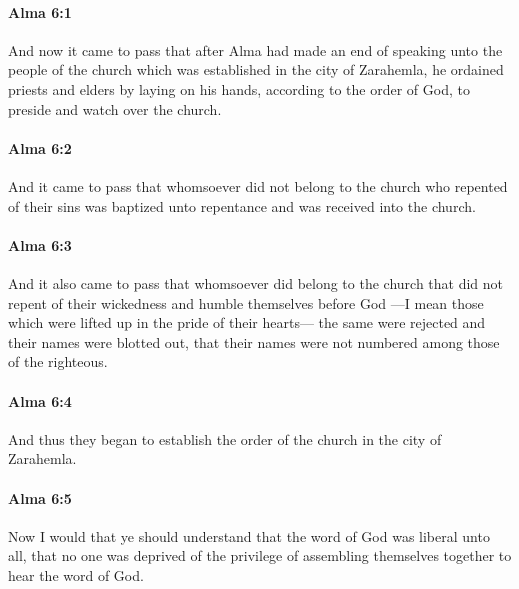 		\paragraph{Alma 6:1} %
			\label{ALMA-6-1}

			And now it came to pass that
			after Alma had made an end of speaking unto the people of the church
			which was established in the city of Zarahemla,
			he ordained priests and elders by laying on his hands,
			according to the order of God,
			to preside and watch over the church.

		\paragraph{Alma 6:2} %
			\label{ALMA-6-2}

			And it came to pass that
			whomsoever did not belong to the church who repented of their sins
			was baptized unto repentance and was received into the church.

		\paragraph{Alma 6:3} %
			\label{ALMA-6-3}

			And it also came to pass that whomsoever did belong to the church
			that did not repent of their wickedness and humble themselves before God
			---I mean those which were lifted up in the pride of their hearts---
			the same were rejected
			and their names were blotted out,
			that their names were not numbered among those of the righteous.

		\paragraph{Alma 6:4} %
			\label{ALMA-6-4}

			And thus they began to establish the order of the church in the city of Zarahemla.

		\paragraph{Alma 6:5} %
			\label{ALMA-6-5}

			Now I would that ye should understand
			that the word of God was liberal unto all,
			that no one was deprived of the privilege of assembling themselves together
			to hear the word of God.

